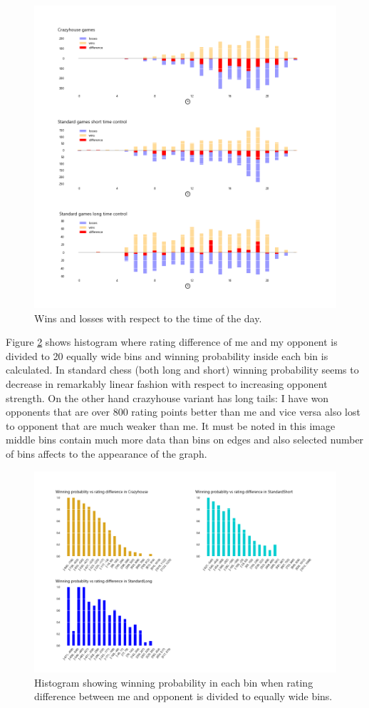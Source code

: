 \begin{figure}[ht!]
    \includegraphics[width=\textwidth]{../img/games_vs_time_of_day.png}
    \caption{Wins and losses with respect to the time of the day.}
    \label{fig:games vs time of day}
\end{figure}

Figure \ref{fig:winning probabilities} shows histogram where rating difference of me and my opponent is divided to 20 equally wide bins and winning probability inside each bin is calculated. In standard chess (both long and short) winning probability seems to decrease in remarkably linear fashion with respect to increasing opponent strength. On the other hand crazyhouse variant has long tails: I have won opponents that are over 800 rating points better than me and vice versa also lost to opponent that are much weaker than me. It must be noted in this image middle bins contain much more data than bins on edges and also selected number of bins affects to the appearance of the graph.

\begin{figure}[ht!]
    \includegraphics[width=\textwidth]{../img/winning_probabilities_vs_rating.png}
    \caption{Histogram showing winning probability in each bin when rating difference between me and opponent is divided to equally wide bins.}
    \label{fig:winning probabilities}
\end{figure}